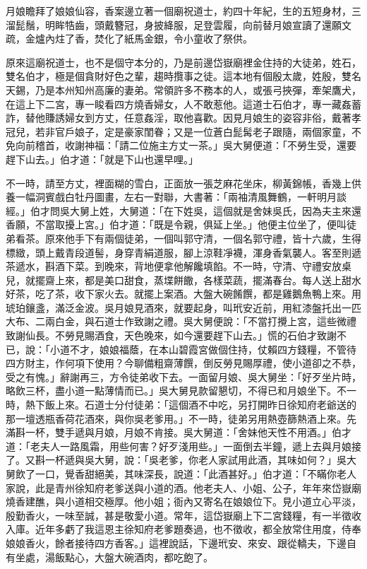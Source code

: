 月娘瞻拜了娘娘仙容，香案邊立著一個廟祝道士，約四十年紀，生的五短身材，三溜髭鬚，明眸牿齒，頭戴簪冠，身披絳服，足登雲履，向前替月娘宣讀了還願文疏，金爐內炷了香，焚化了紙馬金銀，令小童收了祭供。

原來這廟祝道士，也不是個守本分的，乃是前邊岱嶽廟裡金住持的大徒弟，姓石，雙名伯才，極是個貪財好色之輩，趨時攬事之徒。這本地有個殷太歲，姓殷，雙名天錫，乃是本州知州高廉的妻弟。常領許多不務本的人，或張弓挾彈，牽架鷹犬，在這上下二宮，專一睃看四方燒香婦女，人不敢惹他。這道士石伯才，專一藏姦蓄詐，替他賺誘婦女到方丈，任意姦淫，取他喜歡。因見月娘生的姿容非俗，戴著孝冠兒，若非官戶娘子，定是豪家閨眷；又是一位蒼白髭髯老子跟隨，兩個家童，不免向前稽首，收謝神福：「請二位施主方丈一茶。」吳大舅便道：「不勞生受，還要趕下山去。」伯才道：「就是下山也還早哩。」

不一時，請至方丈，裡面糊的雪白，正面放一張芝麻花坐床，柳黃錦帳，香幾上供養一幅洞賓戲白牡丹圖畫，左右一對聯，大書著：「兩袖清風舞鶴，一軒明月談經。」伯才問吳大舅上姓，大舅道：「在下姓吳，這個就是舍妹吳氏，因為夫主來還香願，不當取擾上宮。」伯才道：「既是令親，俱延上坐。」他便主位坐了，便叫徒弟看茶。原來他手下有兩個徒弟，一個叫郭守清，一個名郭守禮，皆十六歲，生得標緻，頭上戴青段道髻，身穿青絹道服，腳上涼鞋凈襪，渾身香氣襲人。客至則遞茶遞水，斟酒下菜。到晚來，背地便拿他解饞填餡。不一時，守清、守禮安放桌兒，就擺齋上來，都是美口甜食，蒸堞餅饊，各樣菜蔬，擺滿春台。每人送上甜水好茶，吃了茶，收下家火去。就擺上案酒。大盤大碗餚饌，都是雞鵝魚鴨上來。用琥珀鑲盞，滿泛金波。吳月娘見酒來，就要起身，叫玳安近前，用紅漆盤托出一匹大布、二兩白金，與石道士作致謝之禮。吳大舅便說：「不當打攪上宮，這些微禮致謝仙長。不勞見賜酒食，天色晚來，如今還要趕下山去。」慌的石伯才致謝不已，說：「小道不才，娘娘福蔭，在本山碧霞宮做個住持，仗賴四方錢糧，不管待四方財主，作何項下使用？今聊備粗齋薄饌，倒反勞見賜厚禮，使小道卻之不恭，受之有愧。」辭謝再三，方令徒弟收下去。一面留月娘、吳大舅坐：「好歹坐片時，略飲三杯，盡小道一點薄情而已。」吳大舅見款留懇切，不得已和月娘坐下。不一時，熱下飯上來。石道士分付徒弟：「這個酒不中吃，另打開昨日徐知府老爺送的那一壇透瓶香荷花酒來，與你吳老爹用。」不一時，徒弟另用熱壺篩熱酒上來。先滿斟一杯，雙手遞與月娘，月娘不肯接。吳大舅道：「舍妹他天性不用酒。」伯才道：「老夫人一路風霜，用些何害？好歹淺用些。」一面倒去半鐘，遞上去與月娘接了。又斟一杯遞與吳大舅，說：「吳老爹，你老人家試用此酒，其味如何？」吳大舅飲了一口，覺香甜絕美，其味深長，說道：「此酒甚好。」伯才道：「不瞞你老人家說，此是青州徐知府老爹送與小道的酒。他老夫人、小姐、公子，年年來岱嶽廟燒香建醮，與小道相交極厚。他小姐；衙內又寄名在娘娘位下。見小道立心平淡，殷勤香火，一味至誠，甚是敬愛小道。常年，這岱嶽廟上下二宮錢糧，有一半徵收入庫。近年多虧了我這恩主徐知府老爹題奏過，也不徵收，都全放常住用度，侍奉娘娘香火，餘者接待四方香客。」這裡說話，下邊玳安、來安、跟從轎夫，下邊自有坐處，湯飯點心，大盤大碗酒肉，都吃飽了。

